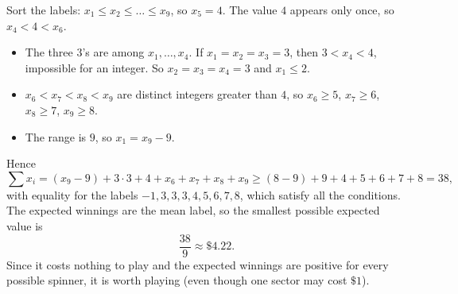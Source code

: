 Sort the labels: $x_1\le x_2\le\dots\le x_9$, so $x_5=4$. The value $4$ appears only once, so $x_4<4<x_6$.
\begin{itemize}
\item The three $3$'s are among $x_1,\dots,x_4$. If $x_1=x_2=x_3=3$, then $3<x_4<4$, impossible for an integer. So $x_2=x_3=x_4=3$ and $x_1\le2$.
\item $x_6<x_7<x_8<x_9$ are distinct integers greater than $4$, so $x_6\ge5$, $x_7\ge6$, $x_8\ge7$, $x_9\ge8$.
\item The range is $9$, so $x_1=x_9-9$.
\end{itemize}
Hence
\[\sum x_i=(x_9-9)+3\cdot3+4+x_6+x_7+x_8+x_9\ge(8-9)+9+4+5+6+7+8=38,\]
with equality for the labels $-1,3,3,3,4,5,6,7,8$, which satisfy all the conditions. The expected winnings are the mean label, so the smallest possible expected value is
\[\boxed{\dfrac{38}{9}\approx\$4.22}.\]
Since it costs nothing to play and the expected winnings are positive for every possible spinner, it is worth playing (even though one sector may cost $\$1$).
